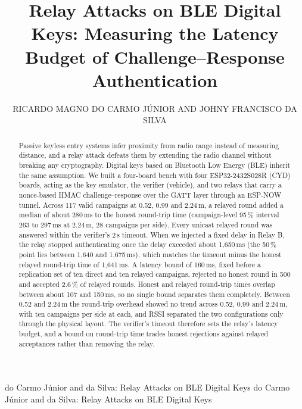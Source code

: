 \documentclass{ieeeaccess}
\begin{document}
\doi{}

\title{Relay Attacks on BLE Digital Keys: Measuring the Latency Budget of Challenge--Response Authentication}

\author{\uppercase{Ricardo Magno do Carmo J\'unior} AND \uppercase{Johny Francisco da Silva}}
\address[1]{Graduate Program in Electrical Engineering (PPG-EEL), Universidade Federal de Itajub\'a (UNIFEI), Itajub\'a, MG, Brazil (e-mail: ricardomdcj@gmail.com; johnyfsilva@gmail.com)}

\markboth
{do Carmo J\'unior and da Silva: Relay Attacks on BLE Digital Keys}
{do Carmo J\'unior and da Silva: Relay Attacks on BLE Digital Keys}

\begin{abstract}
Passive keyless entry systems infer proximity from radio range instead of measuring distance, and a relay attack defeats them by extending the radio channel without breaking any cryptography. Digital keys based on Bluetooth Low Energy (BLE) inherit the same assumption. We built a four-board bench with four ESP32-2432S028R (CYD) boards, acting as the key emulator, the verifier (vehicle), and two relays that carry a nonce-based HMAC challenge--response over the GATT layer through an ESP-NOW tunnel. Across 117 valid campaigns at 0.52, 0.99 and 2.24\,m, a relayed round added a median of about 280\,ms to the honest round-trip time (campaign-level 95\,\% interval 263 to 297\,ms at 2.24\,m, 28 campaigns per side). Every unicast relayed round was answered within the verifier's 2\,s timeout. When we injected a fixed delay in Relay B, the relay stopped authenticating once the delay exceeded about 1,650\,ms (the 50\,\% point lies between 1,640 and 1,675\,ms), which matches the timeout minus the honest relayed round-trip time of 1,641\,ms. A latency bound of 160\,ms, fixed before a replication set of ten direct and ten relayed campaigns, rejected no honest round in 500 and accepted 2.6\,\% of relayed rounds. Honest and relayed round-trip times overlap between about 107 and 150\,ms, so no single bound separates them completely. Between 0.52 and 2.24\,m the round-trip overhead showed no trend across 0.52, 0.99 and 2.24\,m, with ten campaigns per side at each, and RSSI separated the two configurations only through the physical layout. The verifier's timeout therefore sets the relay's latency budget, and a bound on round-trip time trades honest rejections against relayed acceptances rather than removing the relay.
\end{abstract}
\end{document}
